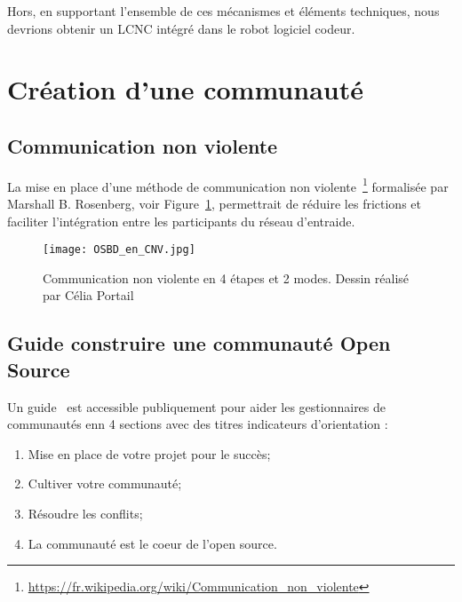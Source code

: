 Hors, en supportant l'ensemble de ces mécanismes et éléments techniques, nous devrions obtenir un LCNC intégré dans le robot logiciel codeur.



\section{Création d’une communauté}

\subsection{Communication non violente}

La mise en place d’une méthode de communication non violente~\footnote{\url{https://fr.wikipedia.org/wiki/Communication_non_violente}} formalisée par Marshall B. Rosenberg, voir Figure~\ref{fig:communication_non_violente}, permettrait de réduire les frictions et faciliter l'intégration entre les participants du réseau d’entraide.

\begin{figure}[htb]
\centering
\texttt{[image: OSBD\_en\_CNV.jpg]}
\caption{Communication non violente en 4 étapes et 2 modes. Dessin réalisé par Célia Portail~\cite{wikipedia_image_non_violente}}
\label{fig:communication_non_violente}
\end{figure}

\subsection{Guide construire une communauté Open Source}

Un guide~\cite{url_open_source_guide} est accessible publiquement pour aider les gestionnaires de communautés enn 4 sections avec des titres indicateurs d’orientation :

\begin{enumerate}
    \item Mise en place de votre projet pour le succès;
    \item Cultiver votre communauté;
    \item Résoudre les conflits;
    \item La communauté est le coeur de l’open source.
\end{enumerate}

